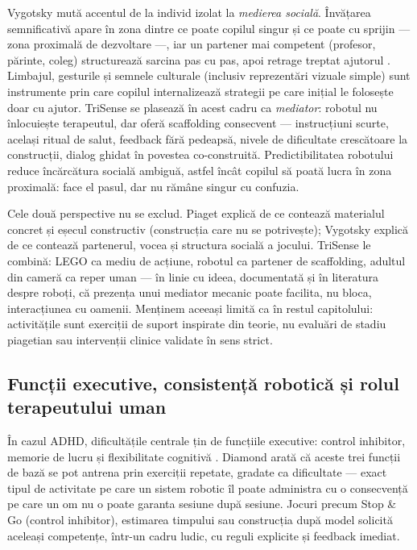 Vygotsky mută accentul de la individ izolat la \emph{medierea socială}. Învățarea semnificativă apare în zona dintre ce poate copilul singur și ce poate cu sprijin — zona proximală de dezvoltare —, iar un partener mai competent (profesor, părinte, coleg) structurează sarcina pas cu pas, apoi retrage treptat ajutorul \cite{vygotsky1978}. Limbajul, gesturile și semnele culturale (inclusiv reprezentări vizuale simple) sunt instrumente prin care copilul internalizează strategii pe care inițial le folosește doar cu ajutor. TriSense se plasează în acest cadru ca \emph{mediator}: robotul nu înlocuiește terapeutul, dar oferă scaffolding consecvent — instrucțiuni scurte, același ritual de salut, feedback fără pedeapsă, nivele de dificultate crescătoare la construcții, dialog ghidat în povestea co-construită. Predictibilitatea robotului reduce încărcătura socială ambiguă, astfel încât copilul să poată lucra în zona proximală: face el pasul, dar nu rămâne singur cu confuzia.

Cele două perspective nu se exclud. Piaget explică de ce contează materialul concret și eșecul constructiv (construcția care nu se potrivește); Vygotsky explică de ce contează partenerul, vocea și structura socială a jocului. TriSense le combină: LEGO ca mediu de acțiune, robotul ca partener de scaffolding, adultul din cameră ca reper uman — în linie cu ideea, documentată și în literatura despre roboți, că prezența unui mediator mecanic poate facilita, nu bloca, interacțiunea cu oamenii. Menținem aceeași limită ca în restul capitolului: activitățile sunt exerciții de suport inspirate din teorie, nu evaluări de stadiu piagetian sau intervenții clinice validate în sens strict.

\subsection{Funcții executive, consistență robotică și rolul terapeutului uman}
\label{sec:executive-terapeut}

În cazul ADHD, dificultățile centrale țin de funcțiile executive: control inhibitor, memorie de lucru și flexibilitate cognitivă \cite{diamond2013}. Diamond arată că aceste trei funcții de bază se pot antrena prin exerciții repetate, gradate ca dificultate — exact tipul de activitate pe care un sistem robotic îl poate administra cu o consecvență pe care un om nu o poate garanta sesiune după sesiune. Jocuri precum Stop \& Go (control inhibitor), estimarea timpului sau construcția după model solicită aceleași competențe, într-un cadru ludic, cu reguli explicite și feedback imediat.

